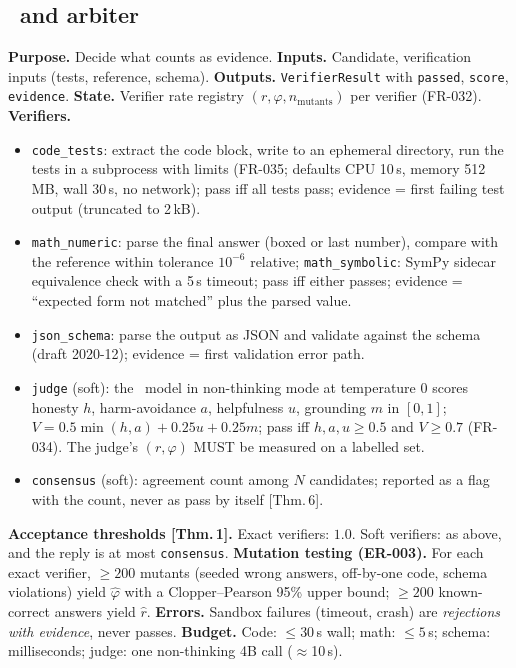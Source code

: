 \documentclass[11pt,a4paper]{article}
\begin{document}
\subsection{\Hub\ and arbiter}
\textbf{Purpose.} Decide what counts as evidence. \textbf{Inputs.} Candidate, verification inputs (tests, reference, schema). \textbf{Outputs.} \texttt{VerifierResult} with \texttt{passed}, \texttt{score}, \texttt{evidence}. \textbf{State.} Verifier rate registry $(r,\varphi,n_{\text{mutants}})$ per verifier (FR-032). \textbf{Verifiers.}
\begin{itemize}
\item \texttt{code\_tests}: extract the code block, write to an ephemeral directory, run the tests in a subprocess with limits (FR-035; defaults CPU 10\,s, memory 512\,MB, wall 30\,s, no network); pass iff all tests pass; evidence = first failing test output (truncated to 2\,kB).
\item \texttt{math\_numeric}: parse the final answer (boxed or last number), compare with the reference within tolerance $10^{-6}$ relative; \texttt{math\_symbolic}: SymPy sidecar equivalence check with a 5\,s timeout; pass iff either passes; evidence = ``expected form not matched'' plus the parsed value.
\item \texttt{json\_schema}: parse the output as JSON and validate against the schema (draft 2020-12); evidence = first validation error path.
\item \texttt{judge} (soft): the \Stwo\ model in non-thinking mode at temperature 0 scores honesty $h$, harm-avoidance $a$, helpfulness $u$, grounding $m$ in $[0,1]$; $V=0.5\min(h,a)+0.25u+0.25m$; pass iff $h,a,u\ge0.5$ and $V\ge0.7$ (FR-034). The judge's $(r,\varphi)$ MUST be measured on a labelled set.
\item \texttt{consensus} (soft): agreement count among $N$ candidates; reported as a flag with the count, never as pass by itself [Thm.\,6].
\end{itemize}
\textbf{Acceptance thresholds [Thm.\,1].} Exact verifiers: $1.0$. Soft verifiers: as above, and the reply is at most \texttt{consensus}. \textbf{Mutation testing (ER-003).} For each exact verifier, $\ge200$ mutants (seeded wrong answers, off-by-one code, schema violations) yield $\hat\varphi$ with a Clopper--Pearson 95\% upper bound; $\ge200$ known-correct answers yield $\hat r$. \textbf{Errors.} Sandbox failures (timeout, crash) are \emph{rejections with evidence}, never passes. \textbf{Budget.} Code: $\le30$\,s wall; math: $\le5$\,s; schema: milliseconds; judge: one non-thinking 4B call ($\approx$10\,s).
\end{document}
